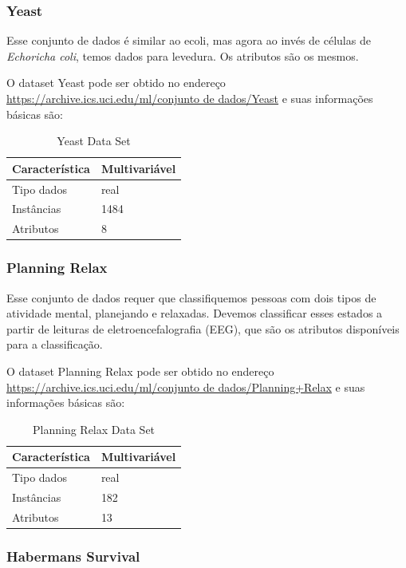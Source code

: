 \documentclass[12pt, a4paper]{article}
\begin{document}
\subsubsection{Yeast}

Esse conjunto de dados é similar ao ecoli, mas agora ao invés de células de \emph{Echoricha coli}, temos dados para levedura. Os atributos são os mesmos.

O dataset Yeast pode ser obtido no endereço \url{https://archive.ics.uci.edu/ml/conjunto de dados/Yeast} e suas informações básicas são:
\begin{table}[!ht]
\centering
\caption{Yeast Data Set}
\label{yeasttable}
\begin{tabular}{|l|l|}
\hline
Característica & Multivariável\\
\hline
Tipo dados & real\\
\hline
Instâncias & 1484\\
\hline
Atributos & 8\\
\hline
\end{tabular}
\end{table}

\subsubsection{Planning Relax}

Esse conjunto de dados requer que classifiquemos pessoas com dois tipos de atividade mental, planejando e relaxadas. Devemos classificar esses estados a partir de leituras de eletroencefalografia (EEG), que são os atributos disponíveis para a classificação.

O dataset Planning Relax pode ser obtido no endereço \url{https://archive.ics.uci.edu/ml/conjunto de dados/Planning+Relax} e suas informações básicas são:
\begin{table}[!ht]
\centering
\caption{Planning Relax Data Set}
\label{planningtable}
\begin{tabular}{|l|l|}
\hline
Característica & Multivariável\\
\hline
Tipo dados & real\\
\hline
Instâncias & 182\\
\hline
Atributos & 13\\
\hline
\end{tabular}
\end{table}

\subsubsection{Habermans Survival}
\end{document}
